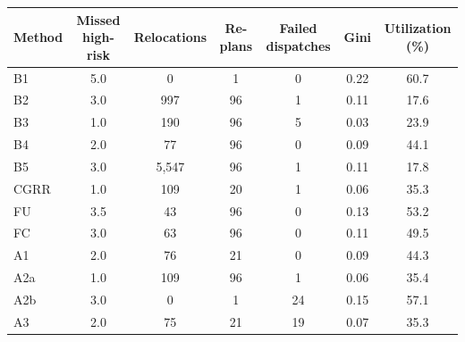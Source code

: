\documentclass[10pt]{article}
\begin{document}
\vspace{4mm}\begin{tabular}{lcccccc}\toprule Method & Missed high-risk & Relocations & Re-plans & Failed dispatches & Gini & Utilization (\%)\\\midrule
B1 & 5.0 & 0 & 1 & 0 & 0.22 & 60.7\\
B2 & 3.0 & 997 & 96 & 1 & 0.11 & 17.6\\
B3 & 1.0 & 190 & 96 & 5 & 0.03 & 23.9\\
B4 & 2.0 & 77 & 96 & 0 & 0.09 & 44.1\\
B5 & 3.0 & 5,547 & 96 & 1 & 0.11 & 17.8\\
CGRR & 1.0 & 109 & 20 & 1 & 0.06 & 35.3\\
FU & 3.5 & 43 & 96 & 0 & 0.13 & 53.2\\
FC & 3.0 & 63 & 96 & 0 & 0.11 & 49.5\\
A1 & 2.0 & 76 & 21 & 0 & 0.09 & 44.3\\
A2a & 1.0 & 109 & 96 & 1 & 0.06 & 35.4\\
A2b & 3.0 & 0 & 1 & 24 & 0.15 & 57.1\\
A3 & 2.0 & 75 & 21 & 19 & 0.07 & 35.3\\
\bottomrule\end{tabular}\normalsize
\clearpage
\end{document}
